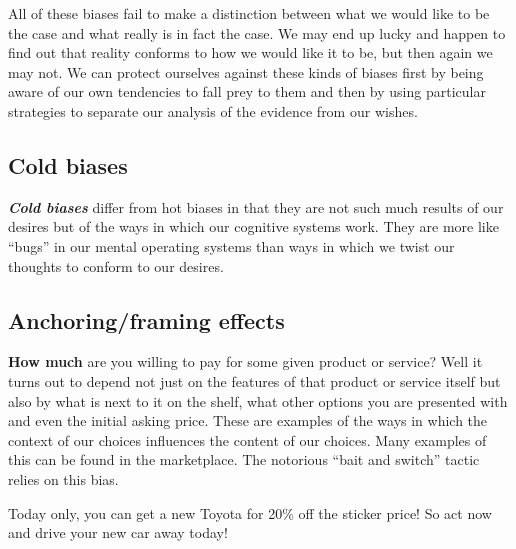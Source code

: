\documentclass[
  12pt, openany]{book}
\theoremstyle{definition}
\theoremstyle{definition}
\theoremstyle{definition}
\theoremstyle{remark}
\begin{document}
All of these biases fail to make a distinction between what we would like to be the case and what really is in fact the case. We may end up lucky and happen to find out that reality conforms to how we would like it to be, but then again we may not. We can protect ourselves against these kinds of biases first by being aware of our own tendencies to fall prey to them and then by using particular strategies to separate our analysis of the evidence from our wishes.

\hypertarget{cold-biases}{%
\subsection*{\texorpdfstring{\textbf{Cold biases}}{Cold biases}}\label{cold-biases}}


\textbf{\emph{Cold biases}} differ from hot biases in that they are not such much results of our desires but of the ways in which our cognitive systems work. They are more like ``bugs'' in our mental operating systems than ways in which we twist our thoughts to conform to our desires.

\hypertarget{anchoringframing-effects}{%
\subsection*{Anchoring/framing effects}\label{anchoringframing-effects}}


\textbf{How much} are you willing to pay for some given product or service? Well it turns out to depend not just on the features of that product or service itself but also by what is next to it on the shelf, what other options you are presented with and even the initial asking price. These are examples of the ways in which the context of our choices influences the content of our choices. Many examples of this can be found in the marketplace. The notorious ``bait and switch'' tactic relies on this bias.

\begin{center}

\begin{argument}

Today only, you can get a new Toyota for 20\% off the sticker price! So act now and drive your new car away today!

\end{argument}

\end{center}
\end{document}
